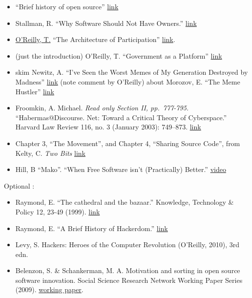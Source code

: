 \begin{itemize}
\itemsep1pt\parskip0pt
\item
  ``Brief history of open source''
  \href{http://www.netc.org/openoptions/background/history.html}{link}
\item
  Stallman, R. ``Why Software Should Not Have Owners.''
  \href{http://www.gnu.org/philosophy/why-free.html}{link}
\item
  \href{http://www.ischool.berkeley.edu/newsandevents/news/20120216timoreilly}{O'Reilly,
  T.} ``The Architecture of Participation''
  \href{http://oreillynet.com/pub/wlg/3017}{link}.
\item
  (just the introduction) O'Reilly, T. ``Government as a Platform''
  \href{http://chimera.labs.oreilly.com/books/1234000000774/ch01.html}{link}
\item
  skim Newitz, A. ``I've Seen the Worst Memes of My Generation Destroyed
  by Madness''
  \href{http://io9.com/ive-seen-the-worst-memes-of-my-generation-destroyed-by-464948581}{link}
  (note comment by O'Reilly) about Morozov, E. ``The Meme Hustler''
  \href{http://www.thebaffler.com/past/the_meme_hustler}{link}
\item
  Froomkin, A. Michael. \emph{Read only Section II, pp.~777-795.}
  ``Habermas@Discourse. Net: Toward a Critical Theory of Cyberspace.''
  Harvard Law Review 116, no. 3 (January 2003): 749--873.
  \href{http://osaka.law.miami.edu/~froomkin/discourse/ils.pdf}{link}
\item
  Chapter 3, ``The Movement'', and Chapter 4, ``Sharing Source Code'',
  from Kelty, C. \emph{Two Bits}
  \href{http://twobits.net/pub/Kelty-TwoBits.pdf}{link}
\item
  Hill, B ``Mako''. ``When Free Software isn't (Practically) Better.''
  \href{http://media.libreplanet.org/u/libby/m/mako/}{video}
\end{itemize}

Optional :

\begin{itemize}
\itemsep1pt\parskip0pt
\item
  Raymond, E. ``The cathedral and the bazaar.'' Knowledge, Technology \&
  Policy 12, 23-49 (1999).
  \href{http://www.catb.org/esr/writings/homesteading/}{link}
\item
  Raymond, E. ``A Brief History of Hackerdom.''
  \href{http://www.catb.org/esr/writings/cathedral-bazaar/hacker-history/}{link}
\item
  Levy, S. Hackers: Heroes of the Computer Revolution (O'Reilly, 2010),
  3rd edn.
\item
  Belenzon, S. \& Schankerman, M. A. Motivation and sorting in open
  source software innovation. Social Science Research Network Working
  Paper Series (2009). \href{http://ssrn.com/abstract=1401776}{working
  paper}.
\end{itemize}

